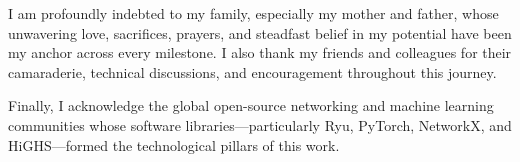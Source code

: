 \documentclass[12pt,a4paper,oneside]{report}
\begin{document}
I am profoundly indebted to my family, especially my mother and father, whose unwavering love, sacrifices, prayers, and steadfast belief in my potential have been my anchor across every milestone. I also thank my friends and colleagues for their camaraderie, technical discussions, and encouragement throughout this journey.

Finally, I acknowledge the global open-source networking and machine learning communities whose software libraries---particularly Ryu, PyTorch, NetworkX, and HiGHS---formed the technological pillars of this work.

\tableofcontents
\listoffigures
\listoftables
\end{document}
